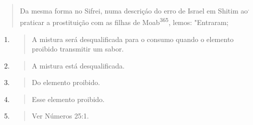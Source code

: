 \begin{quote}
Da mesma forma no Sifrei, numa descriçáo do erro de Israel em Shitim
ao\textsuperscript{.} praticar a prostituição com as filhas de
Moab\textsuperscript{365}, lemos: "Entraram;
\end{quote}

\begin{enumerate}
\def\labelenumi{\arabic{enumi}.}
\setcounter{enumi}{360}
\item
  \begin{quote}
  A mistura será desqualificada para o consumo quando o elemento
  proibido transmitir um sabor.
  \end{quote}
\item
  \begin{quote}
  A mistura está desqualificada.
  \end{quote}
\item
  \begin{quote}
  Do elemento proibido.
  \end{quote}
\item
  \begin{quote}
  Esse elemento proibido.
  \end{quote}
\item
  \begin{quote}
  Ver Números 25:1.
  \end{quote}
\end{enumerate}

